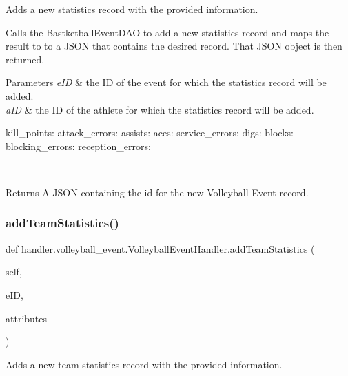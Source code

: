 Adds a new statistics record with the provided information. 

Calls the Bastketball\+Event\+D\+AO to add a new statistics record and maps the result to to a J\+S\+ON that contains the desired record. That J\+S\+ON object is then returned.


\begin{DoxyParams}{Parameters}
{\em e\+ID} & the ID of the event for which the statistics record will be added. \\
\hline
{\em a\+ID} & the ID of the athlete for which the statistics record will be added. \begin{DoxyVerb}           kill_points:
           attack_errors:
           assists:
           aces:
           service_errors:
           digs:
           blocks:
           blocking_errors:
           reception_errors:
\end{DoxyVerb}
\\
\hline
\end{DoxyParams}
\begin{DoxyReturn}{Returns}
A J\+S\+ON containing the id for the new Volleyball Event record. 
\end{DoxyReturn}
\mbox{\label{classhandler_1_1volleyball__event_1_1_volleyball_event_handler_ab3e0e56e56998e7457d2e8114f87dda4}} 
\subsubsection{\texorpdfstring{add\+Team\+Statistics()}{addTeamStatistics()}}
{\footnotesize\ttfamily def handler.\+volleyball\+\_\+event.\+Volleyball\+Event\+Handler.\+add\+Team\+Statistics (\begin{DoxyParamCaption}\item[{}]{self,  }\item[{}]{e\+ID,  }\item[{}]{attributes }\end{DoxyParamCaption})}



Adds a new team statistics record with the provided information. 

